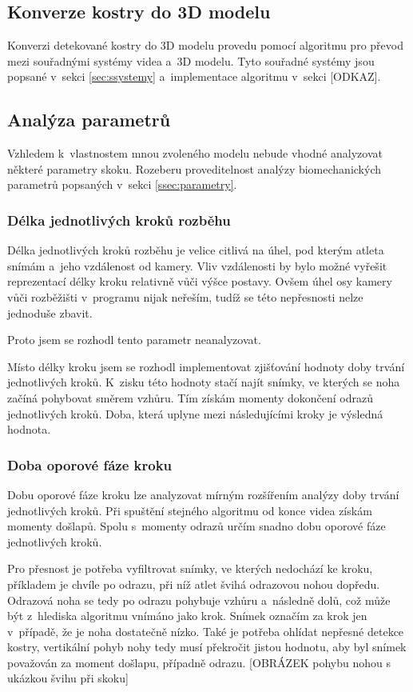 \subsection{Konverze kostry do 3D modelu}

Konverzi detekované kostry do 3D modelu provedu pomocí algoritmu pro převod mezi souřadnými systémy videa a~3D modelu. Tyto souřadné systémy jsou popsané v~sekci \ref{sec:ssystemy} a~implementace algoritmu v~sekci [ODKAZ].

\subsection{Analýza parametrů}

Vzhledem k~vlastnostem mnou zvoleného modelu nebude vhodné analyzovat některé parametry skoku. Rozeberu proveditelnost analýzy biomechanických parametrů popsaných v~sekci \ref{ssec:parametry}.

\subsubsection{Délka jednotlivých kroků rozběhu}
\label{sssec:delkakroku}

Délka jednotlivých kroků rozběhu je velice citlivá na úhel, pod kterým atleta snímám a~jeho vzdálenost od kamery. Vliv vzdálenosti by bylo možné vyřešit reprezentací délky kroku relativně vůči výšce postavy. Ovšem úhel osy kamery vůči rozběžišti v~programu nijak neřeším, tudíž se této nepřesnosti nelze jednoduše zbavit.

Proto jsem se rozhodl tento parametr neanalyzovat.

Místo délky kroku jsem se rozhodl implementovat zjišťování hodnoty doby trvání jednotlivých kroků. K~zisku této hodnoty stačí najít snímky, ve kterých se noha začíná pohybovat směrem vzhůru. Tím získám momenty dokončení odrazů jednotlivých kroků. Doba, která uplyne mezi následujícími kroky je výsledná hodnota.

\subsubsection{Doba oporové fáze kroku}

Dobu oporové fáze kroku lze analyzovat mírným rozšířením analýzy doby trvání jednotlivých kroků. Při spuštění stejného algoritmu od konce videa získám momenty došlapů. Spolu s~momenty odrazů určím snadno dobu oporové fáze jednotlivých kroků.

Pro přesnost je potřeba vyfiltrovat snímky, ve kterých nedochází ke kroku, příkladem je chvíle po odrazu, při níž atlet švihá odrazovou nohou dopředu. Odrazová noha se tedy po odrazu pohybuje vzhůru a~následně dolů, což může být z~hlediska algoritmu vnímáno jako krok. Snímek označím za krok jen v~případě, že je noha dostatečně nízko. Také je potřeba ohlídat nepřesné detekce kostry, vertikální pohyb nohy tedy musí překročit jistou hodnotu, aby byl snímek považován za moment došlapu, případně odrazu. [OBRÁZEK pohybu nohou s ukázkou švihu při skoku]

